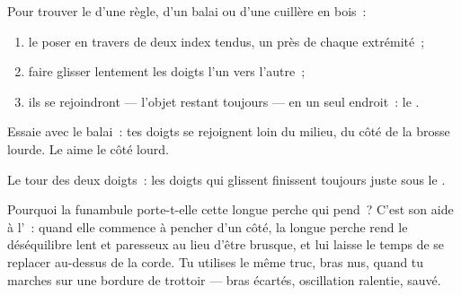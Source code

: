 \begin{method}\label{met:g2:balance-equilibrium:find}
Pour trouver le  d'une règle, d'un balai ou d'une
cuillère en bois~:
\begin{enumerate}
  \item le poser en travers de deux index tendus, un près de chaque
        extrémité~;
  \item faire glisser lentement les doigts l'un vers l'autre~;
  \item ils se rejoindront --- l'objet restant toujours  --- en un seul endroit~: le .
\end{enumerate}
Essaie avec le balai~: tes doigts se rejoignent loin du milieu, du
côté de la brosse lourde. Le  aime le côté lourd.
\end{method}

\begin{omfigure}

{\small Le tour des deux doigts~: les doigts qui glissent finissent
toujours juste sous le .}
\end{omfigure}

\begin{example}\label{ex:g2:balance-equilibrium:acrobat}
Pourquoi la funambule porte-t-elle cette longue perche qui pend~?
C'est son aide à l'~: quand elle commence à pencher d'un
côté, la longue perche rend le déséquilibre lent et paresseux au lieu
d'être brusque, et lui laisse le temps de se replacer au-dessus de la
corde. Tu utilises le même truc, bras nus, quand tu marches sur une
bordure de trottoir --- bras écartés, oscillation ralentie, 
sauvé.
\end{example}


